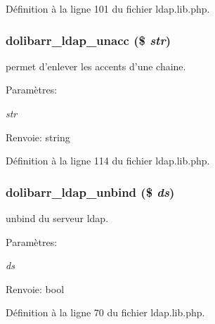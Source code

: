 D\'{e}finition \`{a} la ligne 101 du fichier ldap.lib.php.\hypertarget{ldap_8lib_8php_a5}{
\subsubsection[dolibarr\_\-ldap\_\-unacc]{\setlength{\rightskip}{0pt plus 5cm}dolibarr\_\-ldap\_\-unacc (\$ {\em str})}}
\label{ldap_8lib_8php_a5}


permet d'enlever les accents d'une chaine. 

\begin{Desc}
\item[Param\`{e}tres:]
\begin{description}
\item[{\em str}]\end{description}
\end{Desc}
\begin{Desc}
\item[Renvoie:]string \end{Desc}


D\'{e}finition \`{a} la ligne 114 du fichier ldap.lib.php.\hypertarget{ldap_8lib_8php_a2}{
\subsubsection[dolibarr\_\-ldap\_\-unbind]{\setlength{\rightskip}{0pt plus 5cm}dolibarr\_\-ldap\_\-unbind (\$ {\em ds})}}
\label{ldap_8lib_8php_a2}


unbind du serveur ldap. 

\begin{Desc}
\item[Param\`{e}tres:]
\begin{description}
\item[{\em ds}]\end{description}
\end{Desc}
\begin{Desc}
\item[Renvoie:]bool \end{Desc}


D\'{e}finition \`{a} la ligne 70 du fichier ldap.lib.php.